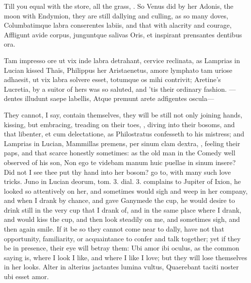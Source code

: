 {Till you equal with the store, all the grass, \etc{}. So Venus did by her
Adonis, the moon with Endymion, they are still dallying and culling, as
so many doves, Columbatimque labra conserentes labiis, and that with
alacrity and courage,
Affligunt avide corpus, junguntque salivas
Oris, et inspirant prensantes dentibus ora.

Tam impresso ore ut vix inde labra detrahant, cervice reclinata,
as Lamprias in Lucian kissed Thaïs, Philippus her Aristaenetus,
amore lymphato tam uriose adhaesit, ut vix labra solvere esset,
totumque os mihi contrivit; Aretine's Lucretia, by a suitor of
hers was so saluted, and 'tis their ordinary fashion.
---dentes illudunt saepe labellis,
Atque premunt arete adfigentes oscula---

They cannot, I say, contain themselves, they will be still not only
joining hands, kissing, but embracing, treading on their toes, \etc{},
diving into their bosoms, and that libenter, et cum delectatione, as
 Philostratus confesseth to his mistress; and Lamprias in Lucian,
Mammillas premens, per sinum clam dextra, \etc{}, feeling their paps, and
that scarce honestly sometimes: as the old man in the Comedy well
observed of his son, Non ego te videbam manum huic puellae in sinum
insere? Did not I see thee put thy hand into her bosom? go to, with
many such love tricks. Juno in Lucian deorum, tom. 3. dial. 3.
complains to Jupiter of Ixion, he looked so attentively on her,
and sometimes would sigh and weep in her company, and when I drank by
chance, and gave Ganymede the cup, he would desire to drink still in
the very cup that I drank of, and in the same place where I drank, and
would kiss the cup, and then look steadily on me, and sometimes sigh,
and then again smile. If it be so they cannot come near to dally, have
not that opportunity, familiarity, or acquaintance to confer and talk
together; yet if they be in presence, their eye will betray them: Ubi
amor ibi oculus, as the common saying is, where I look I like, and
where I like I love; but they will lose themselves in her looks.
Alter in alterius jactantes lumina vultus,
Quaerebant taciti noster ubi esset amor.

}
